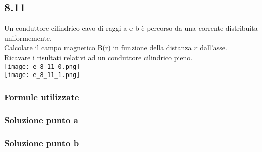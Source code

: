 \documentclass[../../main.tex]{subfiles}
\begin{document}
\subsection*{8.11}
Un conduttore cilindrico cavo di raggi a e b è percorso da una corrente distribuita uniformemente.\\
Calcolare il campo magnetico B(r) in funzione della distanza $r$ dall'asse.\\
Ricavare i risultati relativi ad un conduttore cilindrico pieno.\\
\texttt{[image: e\_8\_11\_0.png]}\\
\texttt{[image: e\_8\_11\_1.png]}
\subsubsection*{Formule utilizzate}
\subsubsection*{Soluzione punto a}
\subsubsection*{Soluzione punto b}
\newpage
\end{document}
